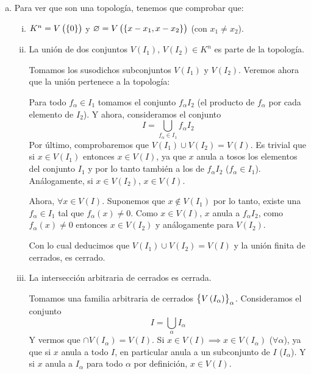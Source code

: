 \begin{eje}
    \begin{enumerate}[(a)]
	\item Para ver que son una topología, tenemos que comprobar que:
	    \begin{enumerate}[i)]
                \item $K^n = V\left( \left\{0\right\} \right)$ y $\varnothing = V\left( \left\{x - x_1, x - x_2\right\} \right)$
                    (con $x_1 \neq x_2$).
	    	\item La unión de dos conjuntos $V\left( I_1 \right), \, V\left( I_2 \right) \in K^n$
		    es parte de la topología.
                    
                    Tomamos los susodichos subconjuntos $V\left( I_1 \right)$ y
		    $V\left( I_2 \right)$. Veremos ahora que la unión pertenece a la topología:

		    Para todo $f_\alpha \in I_1$ tomamos el conjunto $f_\alpha I_2$ (el producto de
                    $f_\alpha$ por cada elemento de $I_2$). Y ahora, consideramos el conjunto
                    \[
                        I = \bigcup_{f_\alpha \in I_1} f_\alpha I_2
                    \]
                    Por último, comprobaremos que $V\left( I_1 \right) \cup V\left( I_2 \right) = V(I)$.
                    Es trivial que si $x \in V\left( I_1 \right)$ entonces $x \in V(I)$, ya que $x$ anula
                    a tosos los elementos del conjunto $I_1$ y por lo tanto también a los de $f_\alpha I_2$
                    ($f_\alpha \in I_1$). Análogamente, si $x \in V\left( I_2 \right)$, $x \in V(I)$.

                    Ahora, $\forall x \in V(I)$. Suponemos que $x \notin V\left( I_1 \right)$ por lo tanto,
                    existe una $f_\alpha \in I_1$ tal que $f_\alpha(x) \neq 0$. Como $x \in V(I)$, $x$ anula
                    a $f_\alpha I_2$, como $f_\alpha(x) \neq 0$ entonces $x \in V\left( I_2 \right)$ y
                    análogamente para $V\left( I_2 \right)$.

                    Con lo cual deducimos que $V\left( I_1 \right) \cup V\left( I_2 \right) = V(I)$ y la
                    unión finita de cerrados, es cerrado.
                \item La intersección arbitraria de cerrados es cerrada.

                    Tomamos una familia arbitraria de cerrados $\left\{V\left( I_\alpha \right)\right\}_{\alpha}$.
                    Consideramos el conjunto
                    \[
                        I = \bigcup_{\alpha} I_\alpha
                    \]
                    Y vermos que $\cap V\left( I_\alpha \right) = V(I)$. Si $x \in V(I) \implies
                    x \in V\left( I_\alpha \right)$ ($\forall \alpha$), ya que si $x$ anula a todo $I$,
                    en particular anula a un subconjunto de $I$ ($I_\alpha$). Y si $x$ anula a $I_\alpha$
                    para todo $\alpha$ por definición, $x \in V(I)$.


\end{enumerate}
\end{enumerate}
\end{eje}
